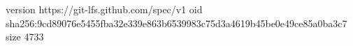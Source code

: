 version https://git-lfs.github.com/spec/v1
oid sha256:9cd89076e5455fba32e339e863b6539983c75d3a4619b45be0e49ce85a0ba3c7
size 4733
